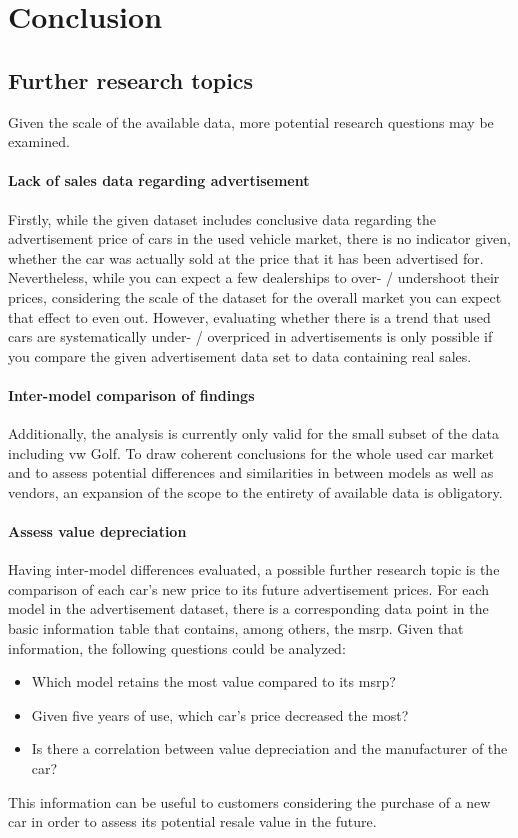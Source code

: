 \chapter{Conclusion}
\section{Further research topics}
Given the scale of the available data, more potential research questions may be examined. 

\subsubsection{Lack of sales data regarding advertisement}
Firstly, while the given dataset includes conclusive data regarding the advertisement price of cars in the used vehicle market,
there is no indicator given, whether the car was actually sold at the price that it has been advertised for. 
\newline
Nevertheless, while you can expect a few dealerships to over- / undershoot their prices,
considering the scale of the dataset for the overall market you can expect that effect to even out.
However, evaluating whether there is a trend that used cars are systematically under- / overpriced in advertisements
is only possible if you compare the given advertisement data set to data containing real sales. %
\subsubsection{Inter-model comparison of findings}
Additionally, the analysis is currently only valid for the small subset of the data including \ac{vw} Golf. 
To draw coherent conclusions for the whole used car market and to assess potential differences and similarities in between 
models as well as vendors, an expansion of the scope to the entirety of available data is obligatory.  
\subsubsection{Assess value depreciation}
Having inter-model differences evaluated, a possible further research topic is the comparison of each car's new price
to its future advertisement prices. For each model in the advertisement dataset, there is a corresponding data point
in the basic information table that contains, among others, the \ac{msrp}. 
\newline
Given that information, the following questions could be analyzed: 
\begin{itemize}
\item Which model retains the most value compared to its \ac{msrp}?
\item Given five years of use, which car's price decreased the most?
\item Is there a correlation between value depreciation and the manufacturer of the car?
\end{itemize}
This information can be useful to customers considering the purchase of a new car in order to assess its potential resale value in the future.

